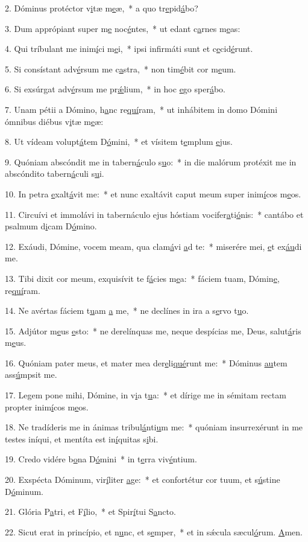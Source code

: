 2. Dóminus protéctor v\uline{i}tæ m\uline{e}æ,~* a quo tr\uline{e}pid\uline{á}bo?\par 
3. Dum apprópiant super m\uline{e} noc\uline{é}ntes,~* ut edant c\uline{a}rnes m\uline{e}as:\par 
4. Qui tríbulant me inim\uline{í}ci m\uline{e}i,~* ipsi infirmáti sunt et c\uline{e}cid\uline{é}runt.\par 
5. Si consístant adv\uline{é}rsum me c\uline{a}stra,~* non tim\uline{é}bit cor m\uline{e}um.\par 
6. Si exsúrgat adv\uline{é}rsum me pr\uline{ǽ}lium,~* in hoc \uline{e}go sper\uline{á}bo.\par 
7. Unam pétii a Dómino, h\uline{a}nc re\uline{quí}ram,~* ut inhábitem in domo Dómini ómnibus diébus v\uline{i}tæ m\uline{e}æ:\par 
8. Ut vídeam volupt\uline{á}tem D\uline{ó}mini,~* et vísitem t\uline{e}mplum \uline{e}jus.\par 
9. Quóniam abscóndit me in tabern\uline{á}culo s\uline{u}o:~* in die malórum protéxit me in abscóndito tabern\uline{á}culi s\uline{u}i.\par 
10. In petra \uline{e}xalt\uline{á}vit me:~* et nunc exaltávit caput meum super inim\uline{í}cos m\uline{e}os.\par 
11. Circuívi et immolávi in tabernáculo ejus hóstiam vocifer\uline{a}ti\uline{ó}nis:~* cantábo et psalmum d\uline{i}cam D\uline{ó}mino.\par 
12. Exáudi, Dómine, vocem meam, qua clam\uline{á}vi \uline{a}d te:~* miserére mei, \uline{e}t ex\uline{áu}di me.\par 
13. Tibi dixit cor meum, exquisívit te f\uline{á}cies m\uline{e}a:~* fáciem tuam, Dómin\uline{e}, re\uline{quí}ram.\par 
14. Ne avértas fáciem t\uline{u}am \uline{a} me,~* ne declínes in ira a s\uline{e}rvo t\uline{u}o.\par 
15. Adjútor m\uline{e}us \uline{e}sto:~* ne derelínquas me, neque despícias me, Deus, salut\uline{á}ris m\uline{e}us.\par 
16. Quóniam pater meus, et mater mea der\uline{e}li\uline{qué}runt me:~* Dóminus \uline{au}tem ass\uline{ú}mpsit me.\par 
17. Legem pone mihi, Dómine, in v\uline{i}a t\uline{u}a:~* et dírige me in sémitam rectam propter inim\uline{í}cos m\uline{e}os.\par 
18. Ne tradíderis me in ánimas tribul\uline{á}nti\uline{u}m me:~* quóniam insurrexérunt in me testes iníqui, et mentíta est in\uline{í}quitas s\uline{i}bi.\par 
19. Credo vidére b\uline{o}na D\uline{ó}mini~* in t\uline{e}rra viv\uline{é}ntium.\par 
20. Exspécta Dóminum, vir\uline{í}liter \uline{a}ge:~* et confortétur cor tuum, et s\uline{ú}stine D\uline{ó}minum.\par 
21. Glória P\uline{a}tri, et F\uline{í}lio,~* et Spir\uline{í}tui S\uline{a}ncto.\par 
22. Sicut erat in princípio, et n\uline{u}nc, et s\uline{e}mper,~* et in sǽcula sæcul\uline{ó}rum. \uline{A}men.\par 
